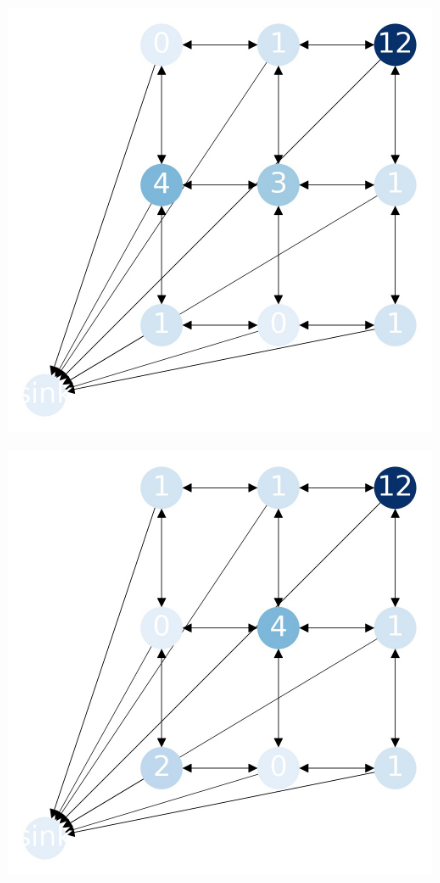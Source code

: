 \documentclass{beamer}
\begin{document}
\begin{frame}
  \begin{figure}[h!]
    \centering
      \includegraphics[scale=0.25]{sandpile_26}
  \end{figure}
\end{frame}


\begin{frame}
  \begin{figure}[h!]
    \centering
      \includegraphics[scale=0.25]{sandpile_27}
  \end{figure}
\end{frame}
\end{document}
